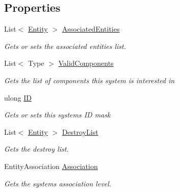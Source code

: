 \subsection*{Properties}
\begin{DoxyCompactItemize}
\item 
List$<$ \hyperlink{class_midnight_blue_1_1_engine_1_1_entity_component_1_1_entity}{Entity} $>$ \hyperlink{class_midnight_blue_1_1_engine_1_1_entity_component_1_1_entity_system_a8c0d1a5e524e46e7c0be016ccbb3ccee}{Associated\+Entities}
\begin{DoxyCompactList}\small\item\em Gets or sets the associated entities list. \end{DoxyCompactList}\item 
List$<$ Type $>$ \hyperlink{class_midnight_blue_1_1_engine_1_1_entity_component_1_1_entity_system_a2314e0dd40f6a59017ea1446c2d1dae4}{Valid\+Components}
\begin{DoxyCompactList}\small\item\em Gets the list of components this system is interested in \end{DoxyCompactList}\item 
ulong \hyperlink{class_midnight_blue_1_1_engine_1_1_entity_component_1_1_entity_system_ada441a647ad7b51e9a95dbfd1b309271}{ID}
\begin{DoxyCompactList}\small\item\em Gets or sets this systems ID mask \end{DoxyCompactList}\item 
List$<$ \hyperlink{class_midnight_blue_1_1_engine_1_1_entity_component_1_1_entity}{Entity} $>$ \hyperlink{class_midnight_blue_1_1_engine_1_1_entity_component_1_1_entity_system_a4f65ada9bcabd5a953e05e5567c83ca9}{Destroy\+List}
\begin{DoxyCompactList}\small\item\em Gets the destroy list. \end{DoxyCompactList}\item 
Entity\+Association \hyperlink{class_midnight_blue_1_1_engine_1_1_entity_component_1_1_entity_system_a6b8663934bf577c3109242f1c4389c40}{Association}
\begin{DoxyCompactList}\small\item\em Gets the systems association level. \end{DoxyCompactList}\end{DoxyCompactItemize}


